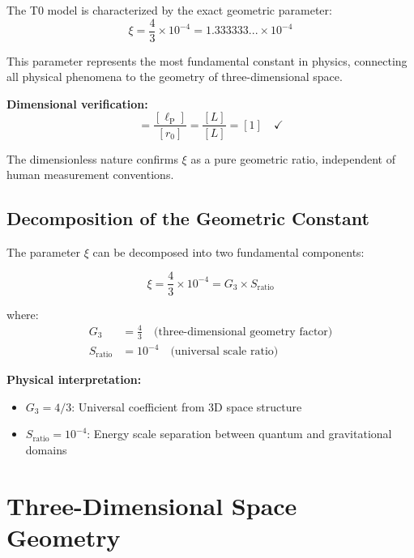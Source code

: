 \documentclass[12pt,a4paper]{report}
\newcommand{\lP}{\ell_{\text{P}}}         %
\newcommand{\rzero}{r_0}                  %
\begin{document}
	The T0 model is characterized by the exact geometric parameter:
	\begin{equation}
		\boxed{\xi = \frac{4}{3} \times 10^{-4} = 1.333333... \times 10^{-4}}
		\label{eq:xi_exact}
	\end{equation}
	
	This parameter represents the most fundamental constant in physics, connecting all physical phenomena to the geometry of three-dimensional space.
	
	\textbf{Dimensional verification:}
	\begin{equation}
		[\xi] = \frac{[\lP]}{[\rzero]} = \frac{[L]}{[L]} = [1] \quad \checkmark
	\end{equation}
	
	The dimensionless nature confirms $\xi$ as a pure geometric ratio, independent of human measurement conventions.
	
	\subsection{Decomposition of the Geometric Constant}
	\label{subsec:decomposition}
	
	The parameter $\xi$ can be decomposed into two fundamental components:
	
	\begin{equation}
		\xi = \frac{4}{3} \times 10^{-4} = G_3 \times S_{\text{ratio}}
	\end{equation}
	
	where:
	\begin{align}
		G_3 &= \frac{4}{3} \quad \text{(three-dimensional geometry factor)} \\
		S_{\text{ratio}} &= 10^{-4} \quad \text{(universal scale ratio)}
	\end{align}
	
	\textbf{Physical interpretation:}
	\begin{itemize}
		\item $G_3 = 4/3$: Universal coefficient from 3D space structure
		\item $S_{\text{ratio}} = 10^{-4}$: Energy scale separation between quantum and gravitational domains
	\end{itemize}
	
	\section{Three-Dimensional Space Geometry}
	\label{sec:3d_space_geometry}
	
\end{document}
